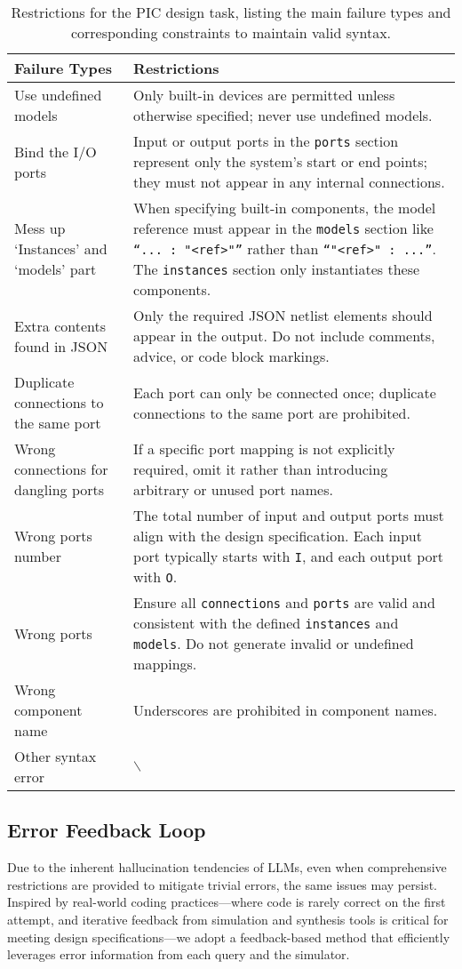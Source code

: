 \begin{table}[!t]
\centering
\caption{Restrictions for the PIC design task, listing the main failure types and corresponding constraints to maintain valid syntax.}
\label{tab:class_restrictions}
\begin{tabular}{|p{3cm}|p{5.5cm}|}
\hline
\textbf{Failure Types} & \textbf{Restrictions}\\
\hline
Use undefined models &
Only built-in devices are permitted
unless otherwise specified; never
use undefined models. \\
\hline
Bind the I/O ports &
Input or output ports in the
\texttt{ports} section represent only the
system’s start or end points; they must
not appear in any internal connections. \\
\hline
Mess up ‘Instances’
and ‘models’ part &
When specifying built-in components,
the model reference must appear in
the \texttt{models} section like
\texttt{``...\,: "<ref>"''} rather
than \texttt{``"<ref>" : ...''}.
The \texttt{instances} section
only instantiates these components. \\
\hline
Extra contents found
in JSON &
Only the required JSON netlist elements
should appear in the output.
Do not include comments, advice,
or code block markings. \\
\hline
Duplicate connections
to the same port &
Each port can only be connected once;
duplicate connections to the same port
are prohibited. \\
\hline
Wrong connections for
dangling ports &
If a specific port mapping is not
explicitly required, omit it rather
than introducing arbitrary or unused
port names. \\
\hline
Wrong ports number &
The total number of input and output ports
must align with the design specification.
Each input port typically starts with \texttt{I},
and each output port with \texttt{O}. \\
\hline
Wrong ports &
Ensure all \texttt{connections} and
\texttt{ports} are valid and consistent
with the defined \texttt{instances} and
\texttt{models}. Do not generate invalid
or undefined mappings. \\
\hline
Wrong component name &
Underscores are prohibited
in component names. \\
\hline
Other syntax error & $\backslash$
 \\
\hline
\end{tabular}
\end{table}


\subsection{Error Feedback Loop}
Due to the inherent hallucination tendencies of LLMs, even when comprehensive restrictions are provided to mitigate trivial errors, the same issues may persist. 
Inspired by real-world coding practices—where code is rarely correct on the first attempt, and iterative feedback from simulation and synthesis tools is critical for meeting design specifications—we adopt a feedback-based method that efficiently leverages error information from each query and the simulator.

